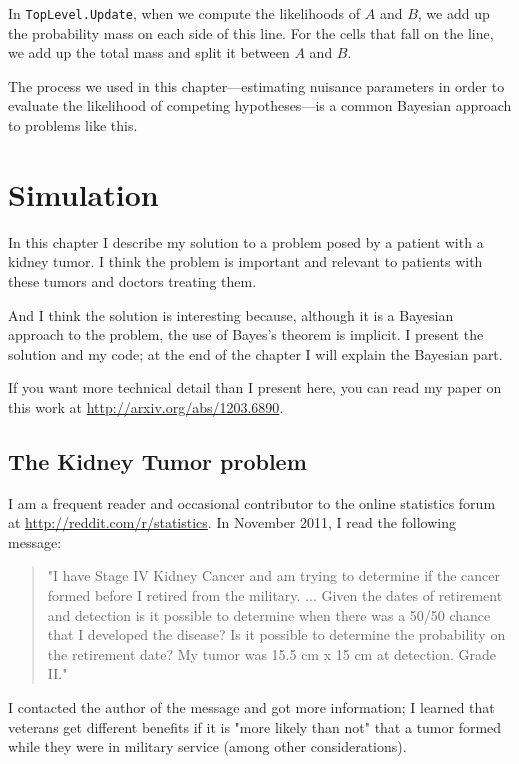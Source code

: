 \documentclass[12pt]{book}
\theoremstyle{exercise}
\newcommand{\py}[1]{{\tt #1}}%
\begin{document}
In \py{TopLevel.Update}, when we compute the likelihoods of $A$ and
$B$, we add up the probability mass on each side of this line.  For the
cells that fall on the line, we add up the total mass and split it
between $A$ and $B$.

The process we used in this chapter---estimating nuisance
parameters in order to evaluate the likelihood of competing
hypotheses---is a common Bayesian approach to problems like this.




\chapter{Simulation}

In this chapter I describe my solution to a problem posed
by a patient with a kidney tumor.  I think the problem is
important and relevant to patients with these tumors
and doctors treating them.

And I think the solution is interesting because, although it
is a Bayesian approach to the problem, the use of Bayes's theorem
is implicit.  I present the solution and my code; at the end
of the chapter I will explain the Bayesian part.

If you want more technical detail than I present here, you can
read my paper on this work at \url{http://arxiv.org/abs/1203.6890}.


\section{The Kidney Tumor problem}

I am a frequent reader and occasional contributor to the online statistics
forum at \url{http://reddit.com/r/statistics}.  In November 2011, I read
the following message:

\begin{quote}
"I have Stage IV Kidney Cancer and am trying to determine if the
  cancer formed before I retired from the military. ... Given the
  dates of retirement and detection is it possible to determine when
  there was a 50/50 chance that I developed the disease? Is it
  possible to determine the probability on the retirement date?  My
  tumor was 15.5 cm x 15 cm at detection. Grade II."
\end{quote}

I contacted the author of the message and got more information; I learned
that veterans get different benefits if it is "more likely than not"
that a tumor formed while they were in military service (among other
considerations).
\end{document}
